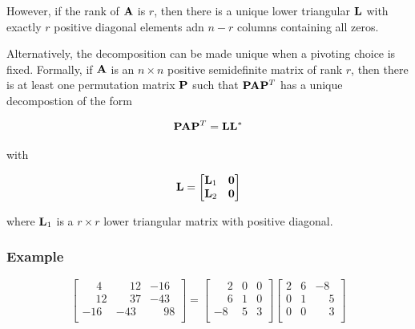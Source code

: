 However, if the rank of $ \mathbf{A} $ is $ r $, then there is a unique lower triangular
$ \mathbf{L} $ with exactly $ r $ positive diagonal elements adn $ n - r $ columns
containing all zeros.

Alternatively, the decomposition can be made unique when  a pivoting choice is
fixed. Formally, if $ \mathbf{A} $ is an $ n \times n $ positive semidefinite matrix
of rank $ r $, then there is at least one permutation matrix $ \mathbf{P} $ such
that $ \mathbf{P} \mathbf{A} \mathbf{P}^T $ has a unique decompostion of the form

\begin{equation}
    \mathbf{P} \mathbf{A} \mathbf{P}^T = \mathbf{L} \mathbf{L}^*
\end{equation}

with

\begin{equation}
    \mathbf{L} = \begin{bmatrix}
        \mathbf{L}_1 & \mathbf{0} \\
        \mathbf{L}_2 & \mathbf{0} \\
    \end{bmatrix}
\end{equation}

where $ \mathbf{L}_1 $ is a $ r \times r $ lower triangular matrix with positive
diagonal.


\subsubsection{Example}

\begin{equation}
    \begin{bmatrix}
        \phantom{-1}4 & \phantom{-}12 & -16 \\
        \phantom{-}12 & \phantom{-}37 & -43 \\
        -16 & -43 & \phantom{-}98 \\
    \end{bmatrix}
    = \begin{bmatrix}
        \phantom{-}2 & 0 & 0 \\
        \phantom{-}6 & 1 & 0 \\
        -8 & 5 & 3 \\
    \end{bmatrix}
    \begin{bmatrix}
        2 & 6 & -8 \\
        0 & 1 & \phantom{-}5 \\
        0 & 0 & \phantom{-}3 \\
    \end{bmatrix}
\end{equation}


